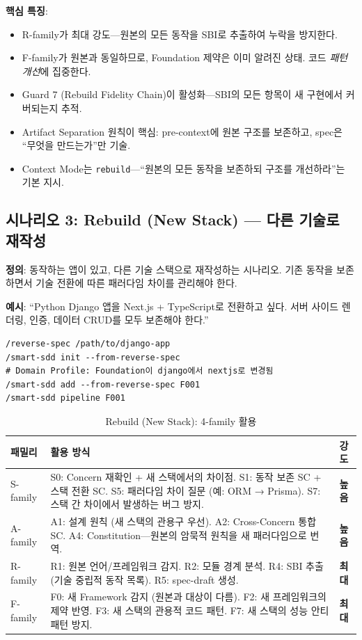 \documentclass[11pt,a4paper,openright,twoside]{report}
\begin{document}
\textbf{핵심 특징}:
\begin{itemize}[nosep]
  \item R-family가 최대 강도---원본의 모든 동작을 SBI로 추출하여 누락을 방지한다.
  \item F-family가 원본과 동일하므로, Foundation 제약은 이미 알려진 상태. 코드 \emph{패턴 개선}에 집중한다.
  \item Guard 7 (Rebuild Fidelity Chain)이 활성화---SBI의 모든 항목이 새 구현에서 커버되는지 추적.
  \item Artifact Separation 원칙이 핵심: pre-context에 원본 구조를 보존하고, spec은 ``무엇을 만드는가''만 기술.
  \item Context Mode는 \texttt{rebuild}---``원본의 모든 동작을 보존하되 구조를 개선하라''는 기본 지시.
\end{itemize}


\subsection{시나리오 3: Rebuild (New Stack) --- 다른 기술로 재작성}
\label{sec:ref-rebuild-new}

\textbf{정의}: 동작하는 앱이 있고, 다른 기술 스택으로 재작성하는 시나리오. 기존 동작을 보존하면서 기술 전환에 따른 패러다임 차이를 관리해야 한다.

\textbf{예시}: ``Python Django 앱을 Next.js + TypeScript로 전환하고 싶다. 서버 사이드 렌더링, 인증, 데이터 CRUD를 모두 보존해야 한다.''

\begin{lstlisting}
/reverse-spec /path/to/django-app
/smart-sdd init --from-reverse-spec
# Domain Profile: Foundation이 django에서 nextjs로 변경됨
/smart-sdd add --from-reverse-spec F001
/smart-sdd pipeline F001
\end{lstlisting}

\begin{table}[H]
\centering
\caption{Rebuild (New Stack): 4-family 활용}
\label{tab:ref-rebuild-new}
\begin{tabularx}{\textwidth}{lXl}
\toprule
\textbf{패밀리} & \textbf{활용 방식} & \textbf{강도} \\
\midrule
S-family &
  S0: Concern 재확인 + 새 스택에서의 차이점. S1: 동작 보존 SC + 스택 전환 SC. S5: 패러다임 차이 질문 (예: ORM → Prisma). S7: 스택 간 차이에서 발생하는 버그 방지. &
  \textbf{높음} \\
\addlinespace
A-family &
  A1: 설계 원칙 (새 스택의 관용구 우선). A2: Cross-Concern 통합 SC. A4: Constitution---원본의 암묵적 원칙을 새 패러다임으로 번역. &
  \textbf{높음} \\
\addlinespace
R-family &
  R1: 원본 언어/프레임워크 감지. R2: 모듈 경계 분석. R4: SBI 추출 (기술 중립적 동작 목록). R5: spec-draft 생성. &
  \textbf{최대} \\
\addlinespace
F-family &
  F0: 새 Framework 감지 (원본과 대상이 다름). F2: 새 프레임워크의 제약 반영. F3: 새 스택의 관용적 코드 패턴. F7: 새 스택의 성능 안티패턴 방지. &
  \textbf{최대} \\
\bottomrule
\end{tabularx}
\end{table}
\end{document}
